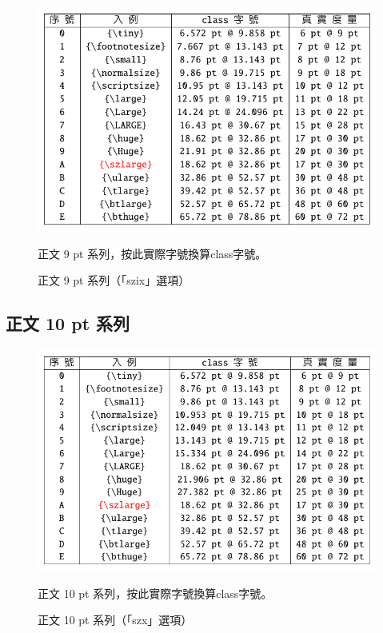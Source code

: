 \begin{figure}[H]
\begin{center}
\caption{正文 9 pt 系列（「szix」選項）}
{ \includegraphics[scale=1]{figures/sz9.pdf}}
\end{center}
\par 正文 9 pt 系列，按此實際字號換算class字號。
\end{figure}

\subsection{正文 10 pt 系列}
\begin{figure}[H]
\begin{center}
\caption{正文 10 pt 系列（「szx」選項）}
{ \includegraphics[scale=1]{figures/sz10.pdf}}
\end{center}
\par 正文 10 pt 系列，按此實際字號換算class字號。
\end{figure}

